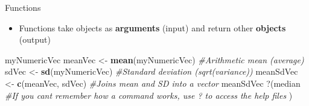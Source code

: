 \documentclass[
  ignorenonframetext,
  aspectratio=169]{beamer}
\newenvironment{Shaded}{\begin{snugshade}}{\end{snugshade}}
\newcommand{\AttributeTok}[1]{\textcolor[rgb]{0.13,0.29,0.53}{#1}}
\newcommand{\CommentTok}[1]{\textcolor[rgb]{0.56,0.35,0.01}{\textit{#1}}}
\newcommand{\FunctionTok}[1]{\textcolor[rgb]{0.13,0.29,0.53}{\textbf{#1}}}
\newcommand{\NormalTok}[1]{#1}
\newcommand{\OtherTok}[1]{\textcolor[rgb]{0.56,0.35,0.01}{#1}}
\newcommand{\StringTok}[1]{\textcolor[rgb]{0.31,0.60,0.02}{#1}}
\providecommand{\tightlist}{%
  \setlength{\itemsep}{0pt}\setlength{\parskip}{0pt}}
\let\oldShaded\Shaded %
\let\endoldShaded\endShaded
\renewenvironment{Shaded}{\footnotesize\oldShaded}{\endoldShaded}
\begin{document}
\begin{frame}[fragile]{Functions}
\protect\hypertarget{functions}{}
\begin{itemize}[<+->]
\tightlist
\item
  Functions take objects as \textbf{arguments} (input) and return other
  \textbf{objects} (output)
\end{itemize}

\begin{Shaded}
\begin{Highlighting}[]
\NormalTok{myNumericVec}
\NormalTok{meanVec }\OtherTok{\textless{}{-}} \FunctionTok{mean}\NormalTok{(myNumericVec)  }\CommentTok{\#Arithmetic mean (average)}
\NormalTok{sdVec }\OtherTok{\textless{}{-}} \FunctionTok{sd}\NormalTok{(myNumericVec)  }\CommentTok{\#Standard deviation (sqrt(variance))}
\NormalTok{meanSdVec }\OtherTok{\textless{}{-}} \FunctionTok{c}\NormalTok{(meanVec, sdVec)  }\CommentTok{\#Joins mean and SD into a vector}
\NormalTok{meanSdVec}
\StringTok{\textasciigrave{}}\AttributeTok{?}\StringTok{\textasciigrave{}}\NormalTok{(median  }\CommentTok{\#If you can\textquotesingle{}t remember how a command works, use \textquotesingle{}?\textquotesingle{} to access the help files}
\NormalTok{)}
\end{Highlighting}
\end{Shaded}
\end{frame}
\end{document}
